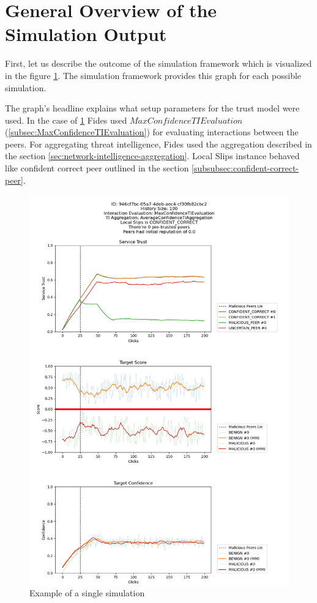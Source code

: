 \section{General Overview of the Simulation Output}
\label{sec:general-overview-of-simulation-output}
First, let us describe the outcome of the simulation framework which is visualized in the figure \ref{fig:single-simulation-example}.
The simulation framework provides this graph for each possible simulation.

The graph's headline explains what setup parameters for the trust model were used. In the case of \ref{fig:single-simulation-example} Fides used $MaxConfidenceTIEvaluation$ (\ref{subsec:MaxConfidenceTIEvaluation}) for evaluating interactions between the peers.
For aggregating threat intelligence, Fides used the aggregation described in the section \ref{sec:network-intelligence-aggregation}.
Local Slips instance behaved like confident correct peer outlined in the section  \ref{subsubsec:confident-correct-peer}.

\begin{figure}
    \centering
    \includegraphics[width=1.0\textwidth]{assets/example_evaluation.png}
    \caption{Example of a single simulation}
    \label{fig:single-simulation-example}
\end{figure}

